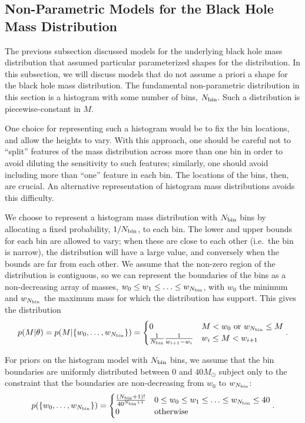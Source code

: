 \documentclass[preprint]{aastex}
\newcommand{\Msun}{M_\odot}
\newcommand{\Nbin}{N_{\textnormal{bin}}}
\begin{document}
\subsection{Non-Parametric Models for the Black Hole Mass Distribution}
\label{sec:non-parametric-models}

The previous subsection discussed models for the underlying black hole
mass distribution that assumed particular parameterized shapes for the
distribution.  In this subsection, we will discuss models that do not
assume a priori a shape for the black hole mass distribution.  The
fundamental non-parametric distribution in this section is a
histogram with some number of bins, $\Nbin$.  Such a distribution is
piecewise-constant in $M$.

One choice for representing such a histogram would be to fix the bin
locations, and allow the heights to vary.  With this approach, one
should be careful not to ``split'' features of the mass distribution
across more than one bin in order to avoid diluting the sensitivity to
such features; similarly, one should avoid including more than ``one''
feature in each bin.  The locations of the bins, then, are crucial.
An alternative representation of histogram mass distributions avoids
this difficulty.

We choose to represent a histogram mass distribution with $\Nbin$ bins
by allocating a fixed probability, $1/\Nbin$, to each bin.  The lower
and upper bounds for each bin are allowed to vary; when these are
close to each other (i.e.\ the bin is narrow), the distribution will
have a large value, and conversely when the bounds are far from each
other.  We assume that the non-zero region of the distribution is
contiguous, so we can represent the boundaries of the bins as a
non-decreasing array of masses, $w_0 \leq w_1 \leq \ldots \leq
w_{\Nbin}$, with $w_0$ the minimum and $w_{\Nbin}$ the maximum mass
for which the distribution has support.  This gives the distribution
\begin{equation}
  \label{eq:hist-def}
  p(M|\theta) = p(M|\{w_0, \ldots, w_{\Nbin}\}) = 
  \begin{cases}
    0 & M < w_0 \textnormal{ or } w_{\Nbin} \leq M \\
    \frac{1}{\Nbin} \frac{1}{w_{i+1} - w_i} & w_i \leq M < w_{i+1}
  \end{cases}.
\end{equation}

For priors on the histogram model with $\Nbin$ bins, we assume that
the bin boundaries are uniformly distributed between 0 and $40 \Msun$
subject only to the constraint that the boundaries are non-decreasing
from $w_0$ to $w_{\Nbin}$:
\begin{equation}
  p(\{w_0, \ldots, w_{\Nbin}\}) = 
  \begin{cases}
    \frac{\left(\Nbin+1\right)!}{40^{\Nbin+1}} & 0 \leq w_0 \leq w_1
    \leq \ldots \leq w_{\Nbin} \leq 40 \\
    0 & \textnormal{otherwise}
  \end{cases}.
\end{equation}
\end{document}
